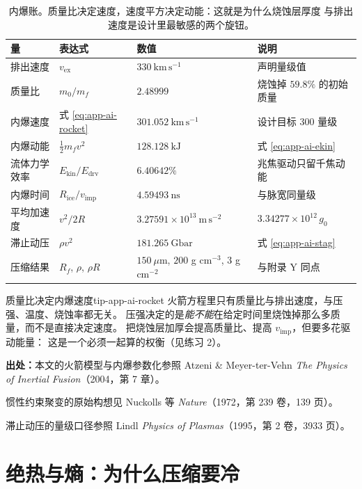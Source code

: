 \begin{table}[htbp]
\centering
\small
\caption{内爆账。质量比决定速度，速度平方决定动能：这就是为什么烧蚀层厚度
与排出速度是设计里最敏感的两个旋钮。}
\label{tab:app-ai-implosion}
\begin{tabular}{p{3.4cm}p{2.8cm}p{3.2cm}p{4.0cm}}
\toprule
量 & 表达式 & 数值 & 说明 \\
\midrule
排出速度 & $v_{\mathrm{ex}}$ & $330\ \mathrm{km\,s^{-1}}$ & 声明量级值 \\
质量比 & $m_0/m_f$ & $2.48999$ & 烧蚀掉 $59.8\%$ 的初始质量 \\
内爆速度 & 式 \eqref{eq:app-ai-rocket} & $301.052\ \mathrm{km\,s^{-1}}$ & 设计目标 $300$ 量级 \\
内爆动能 & $\frac12 m_f v^2$ & $128.128\ \mathrm{kJ}$ & 式 \eqref{eq:app-ai-ekin} \\
流体力学效率 & $E_{\mathrm{kin}}/E_{\mathrm{drv}}$ & $6.40642\%$ & 兆焦驱动只留千焦动能 \\
内爆时间 & $R_{\mathrm{ice}}/v_{\mathrm{imp}}$ & $4.59493\ \mathrm{ns}$ & 与脉宽同量级 \\
平均加速度 & $v^2/2R$ & $3.27591\times10^{13}\ \mathrm{m\,s^{-2}}$ & $3.34277\times10^{12}\,g_0$ \\
滞止动压 & $\rho v^2$ & $181.265\ \mathrm{Gbar}$ & 式 \eqref{eq:app-ai-stag} \\
压缩结果 & $R_f$, $\rho$, $\rho R$ & $150\ \mu$m, $200$ g cm$^{-3}$, $3$ g cm$^{-2}$ & 与附录 Y 同点 \\
\bottomrule
\end{tabular}

\end{table}

\begin{tip}{质量比决定内爆速度}{tip-app-ai-rocket}
火箭方程里只有质量比与排出速度，与压强、温度、烧蚀率都无关。
压强决定的是\emph{能不能}在给定时间里烧蚀掉那么多质量，而不是直接决定速度。
把烧蚀层加厚会提高质量比、提高 $v_{\mathrm{imp}}$，但要多花驱动能量：
这是一个必须一起算的权衡（见练习 2）。
\end{tip}

{\footnotesize
\textbf{出处：}本文的火箭模型与内爆参数化参照 Atzeni \& Meyer-ter-Vehn
\emph{The Physics of Inertial Fusion}（2004，第 7 章）。

惯性约束聚变的原始构想见
Nuckolls 等 \emph{Nature}（1972，第 239 卷，139 页）。

滞止动压的量级口径参照
Lindl \emph{Physics of Plasmas}（1995，第 2 卷，3933 页）。
}

\section{绝热与熵：为什么压缩要冷}
\label{sec:app-ai-adiabat}

